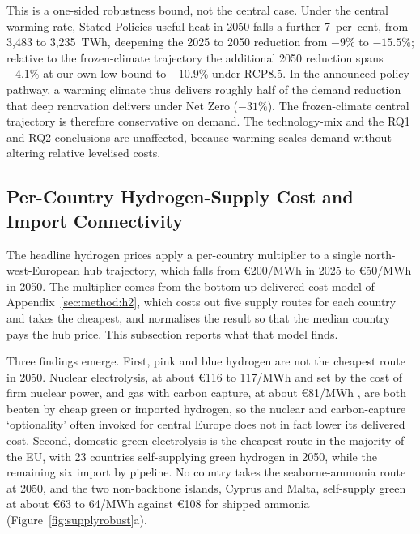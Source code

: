 This is a one-sided robustness bound, not the central case. Under the central warming
rate, Stated Policies useful heat in 2050 falls a further 7~per~cent, from 3,483 to
3,235~TWh, deepening the 2025 to 2050 reduction from $-9\%$ to $-15.5\%$; relative to
the frozen-climate trajectory the additional 2050 reduction spans $-4.1\%$ at our own low
bound to $-10.9\%$ under RCP8.5. In the announced-policy pathway, a warming climate thus
delivers roughly half of the demand reduction that deep renovation delivers under Net
Zero ($-31\%$). The frozen-climate central trajectory is therefore conservative on
demand. The technology-mix and the RQ1 and RQ2 conclusions are unaffected, because
warming scales demand without altering relative levelised costs.

\subsection{Per-Country Hydrogen-Supply Cost and Import Connectivity}
\label{sec:sensitivity:h2supply}

The headline hydrogen prices apply a per-country multiplier to a single
north-west-European hub trajectory, which falls from \euro{}200/MWh in 2025 to
\euro{}50/MWh in 2050. The multiplier comes from
the bottom-up delivered-cost model of Appendix~\ref{sec:method:h2}, which costs out
five supply routes for each country and takes the cheapest, and normalises the result
so that the median country pays the hub price. This subsection reports what that model
finds.

Three findings emerge. First, pink and blue hydrogen are not the cheapest route in
2050. Nuclear electrolysis, at about \euro{}116 to 117/MWh and set by the cost of firm
nuclear power, and gas with carbon capture, at about \euro{}81/MWh
\citep{IEAGHG2022blue}, are both beaten by cheap green or imported hydrogen, so the
nuclear and carbon-capture `optionality' often invoked for central Europe does not in
fact lower its delivered cost. Second, domestic green electrolysis is the cheapest route
in the majority of the EU, with 23 countries self-supplying green hydrogen in 2050,
while the remaining six import by pipeline. No country takes the seaborne-ammonia
route at 2050, and the two non-backbone islands, Cyprus and Malta, self-supply green at
about \euro{}63 to 64/MWh against \euro{}108 for shipped ammonia
(Figure~\ref{fig:supplyrobust}a).

